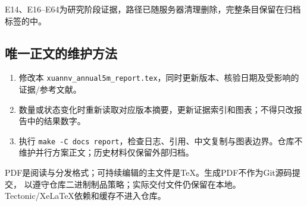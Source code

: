 \documentclass[UTF8,fontset=fandol,zihao=5,a4paper]{ctexart}
\begin{document}
\endgroup
E14、E16--E64为研究阶段证据，路径已随服务器清理删除，完整条目保留在归档标签的中。

\subsection{唯一正文的维护方法}
\begin{enumerate}
\item 修改本 \texttt{xuannv\_annual5m\_report.tex}，同时更新版本、核验日期及受影响的证据/参考文献。
\item 数量或状态变化时重新读取对应版本摘要，更新证据索引和图表；不得只改报告中的结果数字。
\item 执行 \texttt{make -C docs report}，检查日志、引用、中文复制与图表边界。仓库不维护并行方案正文；历史材料仅保留外部归档。
\end{enumerate}

PDF是阅读与分发格式；可持续编辑的主文件是TeX。生成PDF不作为Git源码提交，
以遵守仓库二进制制品策略；实际交付文件仍保留在本地。Tectonic/XeLaTeX依赖和缓存不进入仓库。
\end{document}

